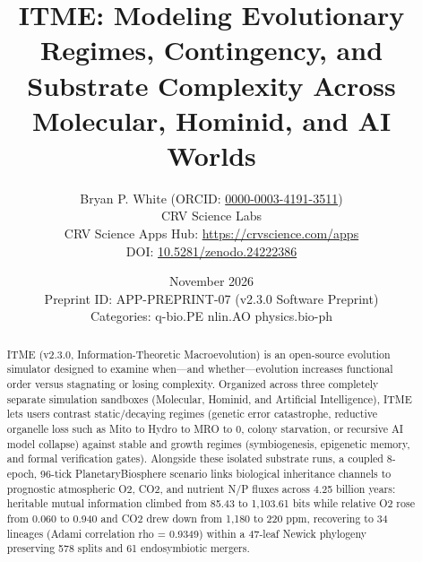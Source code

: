 \documentclass[10pt,letterpaper]{article}
\title{\textbf{ITME: Modeling Evolutionary Regimes, Contingency, and Substrate Complexity Across Molecular, Hominid, and AI Worlds}}
\author{Bryan P. White (ORCID: \href{https://orcid.org/0000-0003-4191-3511}{0000-0003-4191-3511}) \\ CRV Science Labs \\ \small CRV Science Apps Hub: \url{https://crvscience.com/apps} \\ \small DOI: \href{https://doi.org/10.5281/zenodo.24222386}{10.5281/zenodo.24222386}}
\date{November 2026 \\ \small Preprint ID: APP-PREPRINT-07 (v2.3.0 Software Preprint) \\ \small Categories: q-bio.PE \textbullet{} nlin.AO \textbullet{} physics.bio-ph}
\begin{document}
\maketitle

\begin{abstract}
ITME (v2.3.0, Information-Theoretic Macroevolution) is an open-source evolution simulator designed to examine when---and whether---evolution increases functional order versus stagnating or losing complexity. Organized across three completely separate simulation sandboxes (Molecular, Hominid, and Artificial Intelligence), ITME lets users contrast static/decaying regimes (genetic error catastrophe, reductive organelle loss such as Mito to Hydro to MRO to 0, colony starvation, or recursive AI model collapse) against stable and growth regimes (symbiogenesis, epigenetic memory, and formal verification gates). Alongside these isolated substrate runs, a coupled 8-epoch, 96-tick PlanetaryBiosphere scenario links biological inheritance channels to prognostic atmospheric O2, CO2, and nutrient N/P fluxes across 4.25 billion years: heritable mutual information climbed from 85.43 to 1,103.61 bits while relative O2 rose from 0.060 to 0.940 and CO2 drew down from 1,180 to 220 ppm, recovering to 34 lineages (Adami correlation rho = 0.9349) within a 47-leaf Newick phylogeny preserving 578 splits and 61 endosymbiotic mergers.
\end{abstract}
\end{document}
